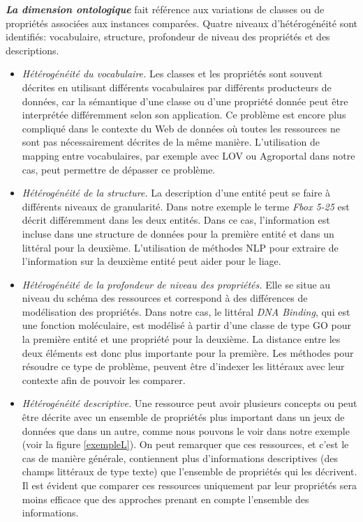 \textbf{\textit{La dimension ontologique}} fait référence aux variations de classes ou de propriétés associées aux instances comparées. Quatre niveaux d'hétérogénéité sont identifiés: vocabulaire, structure, profondeur de niveau des propriétés et des descriptions.\\
\begin{itemize}
\item \textit{Hétérogénéité du vocabulaire.} Les classes et les propriétés sont souvent décrites en utilisant différents vocabulaires par différents producteurs de données, car la sémantique d'une classe ou d'une propriété donnée peut être interprétée différemment selon son application. Ce problème est encore plus compliqué dans le contexte du Web de données où toutes les ressources ne sont pas nécessairement décrites de la même manière. L'utilisation de mapping entre vocabulaires, par exemple avec LOV ou Agroportal dans notre cas, peut permettre de dépasser ce problème.\\

\item \textit{Hétérogénéité de la structure.} La description d'une entité peut se faire à différents niveaux de granularité. Dans notre exemple le terme \textit{Fbox 5-25} est décrit différemment dans les deux entités. Dans ce cas, l'information est incluse dans une structure de données pour la première entité et dans un littéral pour la deuxième. L'utilisation de méthodes NLP %
pour extraire de l'information sur la deuxième entité peut aider pour le liage.\\

\item \textit{Hétérogénéité de la profondeur de niveau des propriétés.} Elle se situe au niveau du schéma des ressources et correspond à des différences de modélisation des propriétés. Dans notre cas, le littéral \textit{DNA Binding}, qui est une fonction moléculaire, est modélisé à partir d'une classe de type GO pour la première entité et une propriété pour la deuxième. La distance entre les deux éléments est donc plus importante pour la première. Les méthodes pour résoudre ce type de problème, peuvent être d'indexer les littéraux avec leur contexte afin de pouvoir les comparer.\\

\item \textit{Hétérogénéité descriptive.} Une ressource peut avoir plusieurs concepts ou peut être décrite avec un ensemble de propriétés plus important dans un jeux de données que dans un autre, comme nous pouvons le voir dans notre exemple (voir la figure \ref{exempleL}). On peut remarquer que ces ressources, et c'est le cas de manière générale, contiennent plus d'informations descriptives (des champs littéraux de type texte) que l'ensemble de propriétés qui les décrivent. Il est évident que comparer ces ressources uniquement par leur propriétés sera moins efficace que des approches prenant en compte l'ensemble des informations. \\

\end{itemize}

